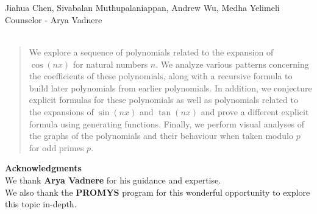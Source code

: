 \documentclass[12pt, letterpaper]{article} %
\begin{document}
\begin{center}
	\ \\
	\vspace{120pt}
	\textsf{\huge\@title}\\[12pt]
Jiahua Chen, Sivabalan Muthupalaniappan, Andrew Wu, Medha Yelimeli
\\ Counselor - Arya Vadnere
\\[6pt]
	\@date
	\makeatother
	\\
\end{center}

\vspace{20pt}
\begin{abstract}
We explore a sequence of polynomials related to the expansion of $\cos (nx)$ for natural numbers $n$. We analyze various patterns concerning the coefficients of these polynomials, along with a recursive formula to build later polynomials from earlier polynomials. In addition, we conjecture explicit formulas for these polynomials as well as polynomials related to the expansions of $\sin (nx)$ and $\tan (nx)$ and prove a different explicit formula using generating functions. Finally, we perform visual analyses of the graphs of the polynomials and their behaviour when taken modulo $p$ for odd primes $p$. \\
\end{abstract}
\vspace{20pt}
\textbf{Acknowledgments} \\

We thank \textbf{Arya Vadnere} for his guidance and expertise. \\

We also thank the \textbf{PROMYS} program for this wonderful opportunity to explore this topic in-depth.



\newpage
\tableofcontents{}
\newpage
\end{document}
